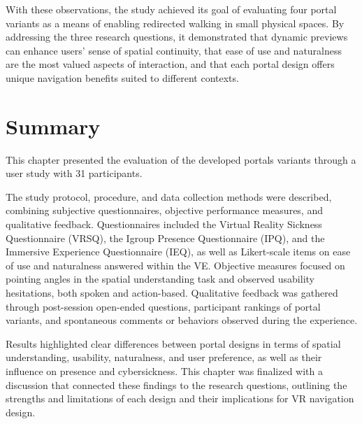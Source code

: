 With these observations, the study achieved its goal of evaluating four portal variants as a means of enabling redirected walking 
in small physical spaces. 
By addressing the three research questions, it demonstrated that dynamic previews can enhance users' sense of spatial continuity, 
that ease of use and naturalness are the most valued aspects of interaction, and that each portal design offers unique navigation 
benefits suited to different contexts.

\section{Summary}
\label{sec:summary}

This chapter presented the evaluation of the developed portals variants through a user study with 31 
participants. 

The study protocol, procedure, and data collection methods were described, combining subjective questionnaires, objective performance measures, 
and qualitative feedback. Questionnaires included the Virtual Reality Sickness Questionnaire (VRSQ), 
the Igroup Presence Questionnaire (IPQ), and the Immersive Experience Questionnaire (IEQ), as well as Likert-scale 
items on ease of use and naturalness answered within the \gls{VE}. 
Objective measures focused on pointing angles in the spatial understanding task 
and observed usability hesitations, both spoken and action-based. Qualitative feedback was gathered through 
post-session open-ended questions, participant rankings of portal variants, and spontaneous comments or 
behaviors observed during the experience.

Results highlighted clear differences 
between portal designs in terms of spatial understanding, usability, naturalness, and user preference, as well as 
their influence on presence and cybersickness. This chapter was finalized with a discussion that connected these findings to the research 
questions, outlining the strengths and limitations of each design and their implications for \gls{VR} navigation 
design.

